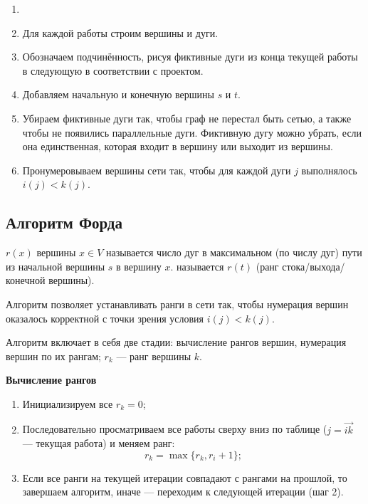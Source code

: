 
\begin{enumerate}[nosep]
	\item[]
	
	\item Для каждой работы строим вершины и дуги.
	
	\item Обозначаем подчинённость, рисуя фиктивные дуги из конца текущей работы в следующую в соответствии с проектом.
	
	\item Добавляем начальную и конечную вершины $s$ и $t$.
	
	\item Убираем фиктивные дуги так, чтобы граф не перестал быть сетью, а также чтобы не появились параллельные дуги. Фиктивную дугу можно убрать, если она единственная, которая входит в вершину или выходит из вершины.
	
	\item Пронумеровываем вершины сети так, чтобы для каждой дуги $j$ выполнялось $i(j) < k(j)$.
\end{enumerate}

\subsection{Алгоритм Форда}


 $r(x)$ вершины $x \in V$ называется число дуг в максимальном (по числу дуг) пути из начальной вершины $s$ в вершину $x$.  называется $r(t)$ (ранг стока/выхода/конечной вершины).

\algorithm[Форда]\label{alg:ford}

Алгоритм позволяет устанавливать ранги в сети так, чтобы нумерация вершин оказалось корректной с точки зрения условия $i(j) < k(j)$.

Алгоритм включает в себя две стадии: вычисление рангов вершин, нумерация вершин по их рангам; $r_k$ --- ранг вершины $k$.

\bigskip

\textbf{Вычисление рангов}
\begin{enumerate}[nosep]
	\item Инициализируем все $r_k = 0$;
	
	\item Последовательно просматриваем все работы сверху вниз по таблице ($j = \vec{ik}$ --- текущая работа) и меняем ранг:
	\[
	r_k = \max\{r_k, r_i+1\};
	\]
	
	\item Если все ранги на текущей итерации совпадают с рангами на прошлой, то завершаем алгоритм, иначе --- переходим к следующей итерации (шаг 2).
\end{enumerate}

